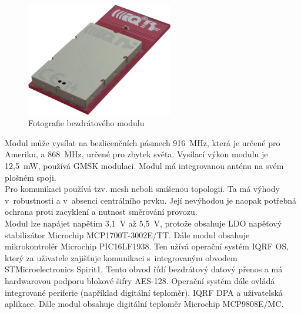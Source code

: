 \documentclass[12pt,a4paper,oneside]{article}
\begin{document}
\begin{figure}[H]
\centering
\label{fig:iqrf/fotka}
\includegraphics[width = 64mm]{img/iqrf.png}
\caption{Fotografie bezdrátového modulu}
\end{figure}

Modul může vysílat na bezlicenčních pásmech 916~MHz, která je určené pro Ameriku, a 868~MHz, určené pro zbytek světa. Vysílací výkon modulu je 12,5~mW, používá GMSK modulaci. Modul má integrovanou anténu na svém plošném spoji. \\

Pro komunikaci používá tzv. mesh neboli smíšenou topologii. Ta má výhody v~robustnosti a v~absenci centrálního prvku. Její nevýhodou je naopak potřebná ochrana proti zacyklení a nutnost směrování provozu. \\

Modul lze napájet napětím 3,1~V až 5,5~V, protože obsahuje LDO napěťový stabilizátor Microchip MCP1700T-3002E/TT. Dále modul obsahuje mikrokontrolér Microchip PIC16LF1938. Ten užívá operační systém IQRF OS, který za uživatele zajišťuje komunikaci s~integrovaným obvodem STMicroelectronics Spirit1. Tento obvod řídí bezdrátový datový přenos a má hardwarovou podporu blokové šifry AES-128. Operační systém dále ovládá integrované periferie (například digitální teploměr). IQRF DPA a uživatelská aplikace. Dále modul obsahuje digitální teploměr Microchip MCP9808E/MC. \\ 
\end{document}
